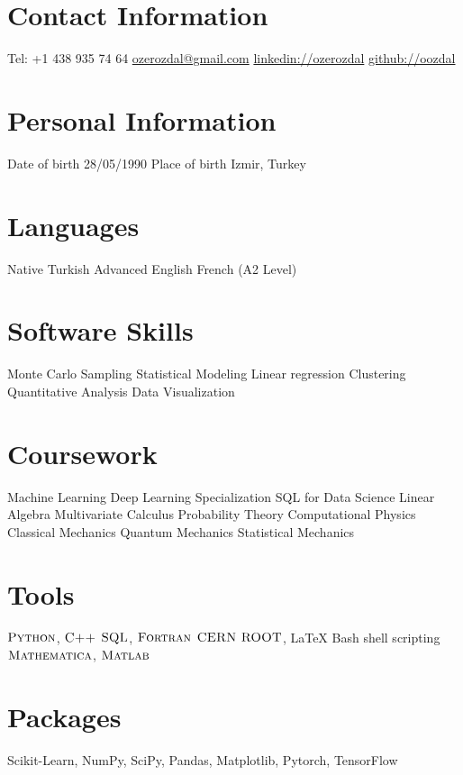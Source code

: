 \documentclass[]{friggeri-cv}
\begin{document}


\begin{aside}
	\section{Contact Information}
	Tel: +1 438 935 74 64
	\href{mailto:ozerozdal@gmail.com}{ozerozdal@gmail.com}
	\href{http://www.linkedin.com/in/ozerozdal/}{linkedin://ozerozdal}
	\href{http://github.com/oozdal}{github://oozdal}
	\section{Personal Information}
	\bullet Date of birth 
	28/05/1990
	\bullet Place of birth
	Izmir, Turkey
	\section{Languages}
	Native Turkish
	Advanced English 
	French (A2 Level)
	\section{Software Skills}
	Monte Carlo Sampling
	Statistical Modeling
	Linear regression
	Clustering     
	Quantitative Analysis    
	Data Visualization
	\section{Coursework}  
	\bullet Machine Learning
	\bullet Deep Learning Specialization
	\bullet SQL for Data Science
	\bullet Linear Algebra
	\bullet Multivariate Calculus
	\bullet Probability Theory
	\bullet Computational Physics    
	\bullet Classical Mechanics
	\bullet Quantum Mechanics
	\bullet Statistical Mechanics
	\section{Tools}
	$\textsc{Python}$, $\textsc{C++}$ 
	$\textsc{SQL}$, $\textsc{Fortran}$
	$\textsc{CERN ROOT}$, LaTeX   
	Bash shell scripting
	$\textsc{Mathematica}$,  $\textsc{Matlab}$
	\section{Packages}  
	Scikit-Learn,
	NumPy, SciPy,
	Pandas, Matplotlib,
	Pytorch, TensorFlow    
\end{aside}
\end{document}
